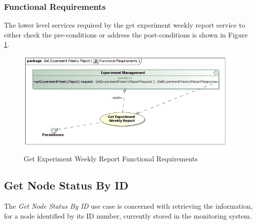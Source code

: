 \subsubsection {Functional Requirements}
The lower level services required by the get experiment weekly report service to 
either check the pre-conditions or address the post-conditions is shown in
Figure \ref{fig:getExperimentWeeklyReportFunctionalRequirements}.
\begin{figure}[H]
  \begin{center}
  \includegraphics[scale=0.38]{../Diagrams and Charts/Experiment/Get Experiment Weekly Report Functional Requirements.jpg}
  \caption{Get Experiment Weekly Report Functional Requirements}
  \label{fig:getExperimentWeeklyReportFunctionalRequirements}
  \end{center}
\end{figure}



\subsection {Get Node Status By ID}
The \textit{Get Node Status By ID} use case is concerned with retrieving
the information, for a node identified by its ID number, currently stored in the
monitoring system.

